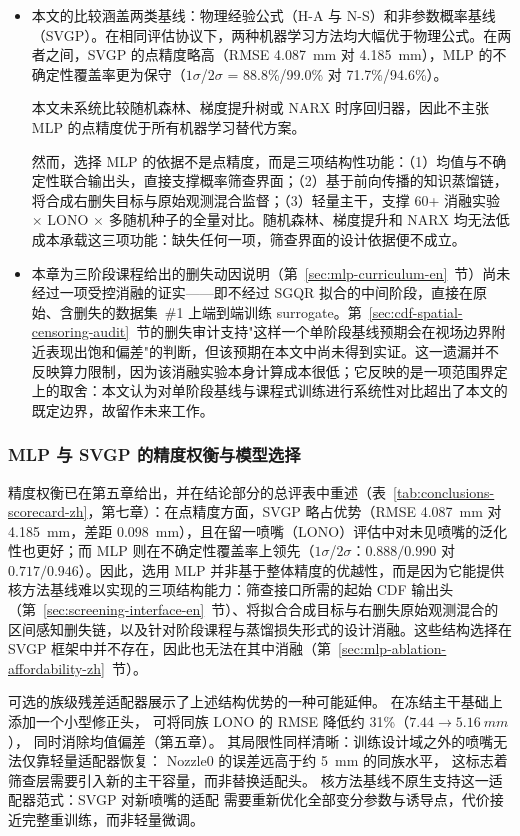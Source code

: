 \begin{itemize}
	\item 本文的比较涵盖两类基线：物理经验公式（H-A 与 N-S）和非参数概率基线（SVGP）。在相同评估协议下，两种机器学习方法均大幅优于物理公式。在两者之间，SVGP 的点精度略高（RMSE \SI{4.087}{mm} 对 \SI{4.185}{mm}），MLP 的不确定性覆盖率更为保守（$1\sigma$/$2\sigma$ = 88.8\%/99.0\% 对 71.7\%/94.6\%）。

	      本文未系统比较随机森林、梯度提升树或 NARX 时序回归器，因此不主张 MLP 的点精度优于所有机器学习替代方案。

	      然而，选择 MLP 的依据不是点精度，而是三项结构性功能：（1）均值与不确定性联合输出头，直接支撑概率筛查界面；（2）基于前向传播的知识蒸馏链，将合成右删失目标与原始观测混合监督；（3）轻量主干，支撑 60+ 消融实验 $\times$ LONO $\times$ 多随机种子的全量对比。随机森林、梯度提升和 NARX 均无法低成本承载这三项功能：缺失任何一项，筛查界面的设计依据便不成立。

	\item 本章为三阶段课程给出的删失动因说明（第~\ref{sec:mlp-curriculum-en}~节）尚未经过一项受控消融的证实——即不经过 SGQR 拟合的中间阶段，直接在原始、含删失的数据集~\#1 上端到端训练 surrogate。第~\ref{sec:cdf-spatial-censoring-audit}~节的删失审计支持"这样一个单阶段基线预期会在视场边界附近表现出饱和偏差"的判断，但该预期在本文中尚未得到实证。这一遗漏并不反映算力限制，因为该消融实验本身计算成本很低；它反映的是一项范围界定上的取舍：本文认为对单阶段基线与课程式训练进行系统性对比超出了本文的既定边界，故留作未来工作。
\end{itemize}

\subsubsection*{MLP 与 SVGP 的精度权衡与模型选择}

精度权衡已在第五章给出，并在结论部分的总评表中重述（表~\ref{tab:conclusions-scorecard-zh}，第七章）：在点精度方面，SVGP 略占优势（RMSE \SI{4.087}{mm} 对 \SI{4.185}{mm}，差距 \SI{0.098}{mm}），且在留一喷嘴（LONO）评估中对未见喷嘴的泛化性也更好；而 MLP 则在不确定性覆盖率上领先（$1\sigma$/$2\sigma$：$0.888/0.990$ 对 $0.717/0.946$）。因此，选用 MLP 并非基于整体精度的优越性，而是因为它能提供核方法基线难以实现的三项结构能力：筛查接口所需的起始 CDF 输出头（第~\ref{sec:screening-interface-en}~节）、将拟合合成目标与右删失原始观测混合的区间感知删失链，以及针对阶段课程与蒸馏损失形式的设计消融。这些结构选择在 SVGP 框架中并不存在，因此也无法在其中消融（第~\ref{sec:mlp-ablation-affordability-zh}~节）。

可选的族级残差适配器展示了上述结构优势的一种可能延伸。
在冻结主干基础上添加一个小型修正头，
可将同族 LONO 的 RMSE 降低约 31\%（$7.44 \rightarrow \SI{5.16}{mm}$），
同时消除均值偏差（第五章）。
其局限性同样清晰：训练设计域之外的喷嘴无法仅靠轻量适配器恢复：
Nozzle0 的误差远高于约 \SI{5}{mm} 的同族水平，
这标志着筛查层需要引入新的主干容量，而非替换适配头。
核方法基线不原生支持这一适配器范式：SVGP 对新喷嘴的适配
需要重新优化全部变分参数与诱导点，代价接近完整重训练，而非轻量微调。

